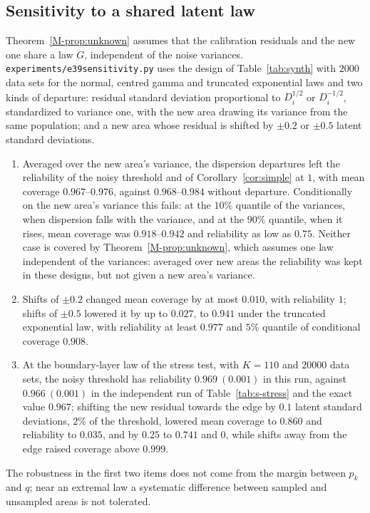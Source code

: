 \documentclass[11pt]{article}
\renewcommand{\_}{\usc\allowbreak}
\begin{document}
\subsection*{Sensitivity to a shared latent law}

Theorem~\ref{M-prop:unknown} assumes that the calibration residuals and the new one share a law $G$, independent of the noise variances. \texttt{experiments/e39\_sensitivity.py} uses the design of Table~\ref{tab:synth} with $2000$ data sets for the normal, centred gamma and truncated exponential laws and two kinds of departure: residual standard deviation proportional to $D_i^{1/2}$ or $D_i^{-1/2}$, standardized to variance one, with the new area drawing its variance from the same population; and a new area whose residual is shifted by $\pm0.2$ or $\pm0.5$ latent standard deviations.
\begin{enumerate}
\item Averaged over the new area's variance, the dispersion departures left the reliability of the noisy threshold and of Corollary~\ref{cor:simple} at $1$, with mean coverage $0.967$--$0.976$, against $0.968$--$0.984$ without departure. Conditionally on the new area's variance this fails: at the $10\%$ quantile of the variances, when dispersion falls with the variance, and at the $90\%$ quantile, when it rises, mean coverage was $0.918$--$0.942$ and reliability as low as $0.75$. Neither case is covered by Theorem~\ref{M-prop:unknown}, which assumes one law independent of the variances: averaged over new areas the reliability was kept in these designs, but not given a new area's variance.
\item Shifts of $\pm0.2$ changed mean coverage by at most $0.010$, with reliability $1$; shifts of $\pm0.5$ lowered it by up to $0.027$, to $0.941$ under the truncated exponential law, with reliability at least $0.977$ and $5\%$ quantile of conditional coverage $0.908$.
\item At the boundary-layer law of the stress test, with $K = 110$ and $20000$ data sets, the noisy threshold has reliability $0.969\ (0.001)$ in this run, against $0.966\ (0.001)$ in the independent run of Table~\ref{tab:s-stress} and the exact value $0.967$; shifting the new residual towards the edge by $0.1$ latent standard deviations, $2\%$ of the threshold, lowered mean coverage to $0.860$ and reliability to $0.035$, and by $0.25$ to $0.741$ and $0$, while shifts away from the edge raised coverage above $0.999$.
\end{enumerate}
The robustness in the first two items does not come from the margin between $p_k$ and $q$; near an extremal law a systematic difference between sampled and unsampled areas is not tolerated.
\end{document}
